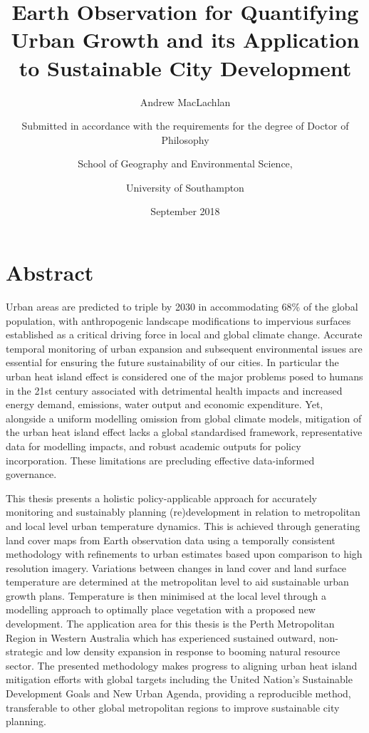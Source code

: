 \documentclass[]{book}
\title{Earth Observation for Quantifying Urban Growth and its Application to
Sustainable City Development}
\subtitle{Andrew MacLachlan}
\author{Submitted in accordance with the requirements for the degree of Doctor
of Philosophy \and School of Geography and Environmental Science, \and University of Southampton}
\date{September 2018}
\begin{document}
\maketitle

{
\setcounter{tocdepth}{1}
\tableofcontents
}
\chapter*{Abstract}\label{abstract}

Urban areas are predicted to triple by 2030 in accommodating 68\% of the
global population, with anthropogenic landscape modifications to
impervious surfaces established as a critical driving force in local and
global climate change. Accurate temporal monitoring of urban expansion
and subsequent environmental issues are essential for ensuring the
future sustainability of our cities. In particular the urban heat island
effect is considered one of the major problems posed to humans in the
21st century associated with detrimental health impacts and increased
energy demand, emissions, water output and economic expenditure. Yet,
alongside a uniform modelling omission from global climate models,
mitigation of the urban heat island effect lacks a global standardised
framework, representative data for modelling impacts, and robust
academic outputs for policy incorporation. These limitations are
precluding effective data-informed governance.

This thesis presents a holistic policy-applicable approach for
accurately monitoring and sustainably planning (re)development in
relation to metropolitan and local level urban temperature dynamics.
This is achieved through generating land cover maps from Earth
observation data using a temporally consistent methodology with
refinements to urban estimates based upon comparison to high resolution
imagery. Variations between changes in land cover and land surface
temperature are determined at the metropolitan level to aid sustainable
urban growth plans. Temperature is then minimised at the local level
through a modelling approach to optimally place vegetation with a
proposed new development. The application area for this thesis is the
Perth Metropolitan Region in Western Australia which has experienced
sustained outward, non-strategic and low density expansion in response
to booming natural resource sector. The presented methodology makes
progress to aligning urban heat island mitigation efforts with global
targets including the United Nation's Sustainable Development Goals and
New Urban Agenda, providing a reproducible method, transferable to other
global metropolitan regions to improve sustainable city planning.
\end{document}
